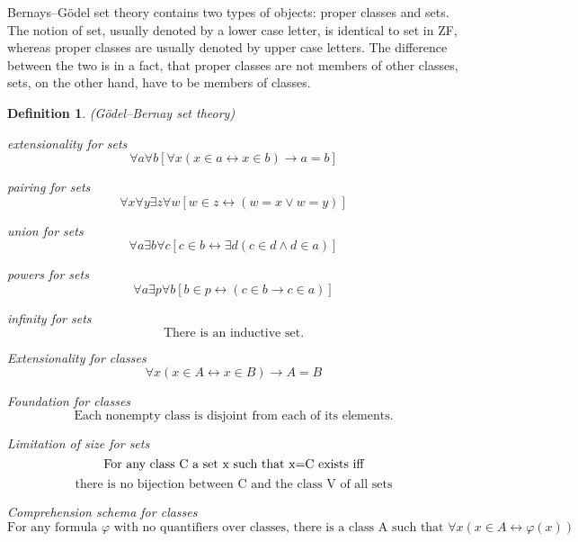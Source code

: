\documentclass[12pt,a4paper]{article}
\newtheorem{definition}[theorem]{Definition}
\renewcommand{\iff}{\leftrightarrow}
\newcommand{\then}{\rightarrow}
\newcommand{\bce}{\begin{compactenum}}
\newcommand{\ece}{\end{compactenum}}
\begin{document}
Bernays–G{\"o}del set theory contains two types of objects: proper classes and sets. The notion of set, usually denoted by a lower case letter, is identical to set in ZF, whereas proper classes are usually denoted by upper case letters. The difference between the two is in a fact, that 
proper classes are not members of other classes, sets, on the other hand, have to be members of classes.
\begin{definition}(G{\"o}del–Bernay set theory)
\bce[(i)]
\item \emph{extensionality for sets}
\begin{equation}
\forall a \forall b [\forall x(x \in a \iff x \in b) \then a = b]
\end{equation}
\item \emph{pairing for sets}
\begin{equation}
\forall x \forall y \exists z \forall w [w \in z \iff (w = x \lor w = y)]
\end{equation}
\item \emph{union for sets}
\begin{equation}
\forall a \exists b \forall c [c \in b \iff \exists d ( c \in d \land d \in a)]
\end{equation}
\item \emph{powers for sets}
\begin{equation}
\forall a \exists p \forall b [b \in p \iff (c \in b \then c \in a)]
\end{equation}
\item \emph{infinity for sets}
\begin{equation}
\mbox{There is an inductive set.}
\end{equation}
\item \emph{Extensionality for classes}
\begin{equation}
\forall x (x \in A \iff x \in B) \then A = B
\end{equation}

\item \emph{Foundation for classes}
\begin{equation}
\mbox{Each nonempty class is disjoint from each of its elements.}
\end{equation}

\item \emph{Limitation of size for sets}
\begin{equation}
\mbox{For any class C a set x such that x=C exists iff}\newline
\end{equation}
\begin{equation}
\mbox{there is no bijection between C and the class V of all sets}
\end{equation}
\item \emph{Comprehension schema for classes}
\begin{equation}
\mbox{For any formula }\varphi\mbox{ with no quantifiers over classes, there is a class A such that }\forall x (x \in A \iff \varphi(x))
\end{equation}
\ece
\end{definition}
\end{document}
